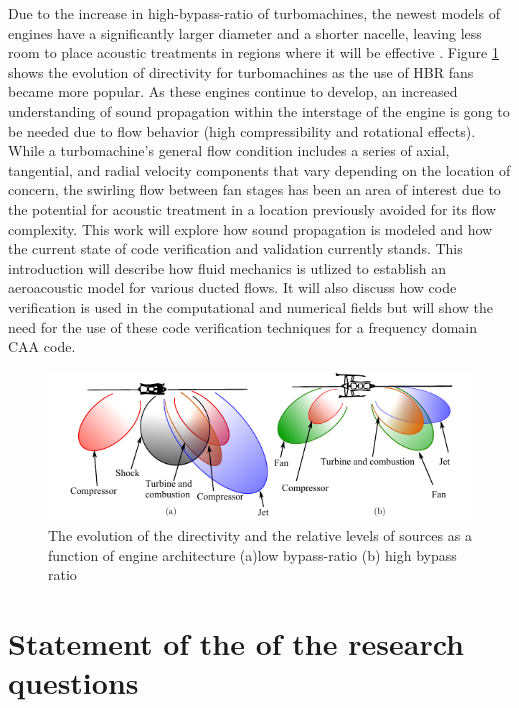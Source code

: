 Due to the increase in high-bypass-ratio of turbomachines, the newest models of 
engines have a significantly larger diameter and a shorter nacelle, leaving less
room to place acoustic treatments in regions where it will be effective \cite{Kozaczuk2017}.
Figure \ref{fig:intro} shows the evolution of directivity for turbomachines as 
the use of HBR fans became more popular. As these engines continue 
to develop, an increased understanding of sound propagation within
the interstage of the engine is gong to be needed due to flow behavior (high compressibility
and rotational effects).  While a turbomachine's general flow condition includes 
a series of axial, tangential, and radial velocity components that vary
depending on the location of concern, the swirling flow between fan stages has 
been an area of interest due to the potential for acoustic treatment in a 
location previously avoided for its flow complexity. This work will explore how 
sound propagation is modeled and how the current state of code verification and 
validation currently stands. This introduction will describe how fluid mechanics
is utlized to establish an aeroacoustic model for various ducted flows. It will 
also discuss how code verification is used in the computational and numerical fields
but will show the need for the use of these code verification techniques for 
a frequency domain CAA code. 




\begin{figure}
    \centering
    \includegraphics[width=\textwidth]{Chapter-1-Introduction/Figures/lowVhighBPRdirectivitySMITH2004.png}
    \caption{ The evolution of the directivity and the 
    relative levels of sources as a function of engine architecture (a)low bypass-ratio (b) high bypass ratio \cite{smith1989aircraft}}
    \label{fig:intro}
\end{figure}

\section{Statement of the of the research questions}
